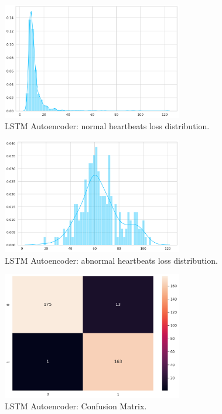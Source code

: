 \documentclass{article}
\begin{document}
\begin{figure}[!t]
    \centering
    \includegraphics[width=0.7\textwidth]{images/baseline_normal.png}
    \caption{LSTM Autoencoder: normal heartbeats loss distribution.}
\end{figure}

\begin{figure}[!t]
    \centering
    \includegraphics[width=0.7\textwidth]{images/baseline_abnormal.png}
    \caption{LSTM Autoencoder: abnormal heartbeats loss distribution.}
\end{figure}

\begin{figure}[!t]
    \centering
    \includegraphics[width=0.7\textwidth]{images/baseline_Cofmat.png}
    \caption{LSTM Autoencoder: Confusion Matrix.}
\end{figure}
\end{document}
